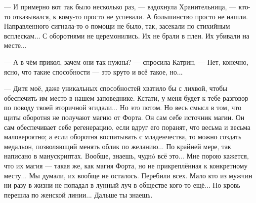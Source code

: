 --- И примерно вот так было несколько раз, --- вздохнула Хранительница, --- кто-то отказывался, к кому-то просто не успевали.
А большинство просто не нашли. Направленного сигнала-то о помощи не было, так, засекали по стихийным всплескам...
С оборотнями не церемонились. Их не брали в плен. Их убивали на месте...

--- А в чём прикол, зачем они так нужны? --- спросила Катрин, --- Нет, конечно, ясно, что такие способности
--- это круто и всё такое, но...

--- Дитя моё, даже уникальных способностей хватило бы с лихвой, чтобы обеспечить им место в нашем заповеднике.
Кстати, у меня будет к тебе разговор по поводу твоей вторичной эгидали... Но это потом.
Но весь смысл в том, что щиты оборотня не получают магию от Форта. Он сам себе источник магии.
Он сам обеспечивает себе регенерацию, если вдруг его поранят, что весьма и весьма маловероятно;
а если оборотня воспитывать с младенчества, то можно создать медальон, позволяющий менять облик по желанию...
По крайней мере, так написано в манускриптах. Вообще, знаешь, чудн\'o всё это...
Мне порою кажется, что их магия --- такая же, как магия Форта, но не прикреплённая к конкретному месту...
Мы думали, их вообще не осталось. Перебили всех.
Мало кто из мужчин ни разу в жизни не попадал в лунный луч в обществе кого-то ещё...
Но кровь перешла по женской линии... Дальше ты знаешь.

\emptypar

\emptypar
